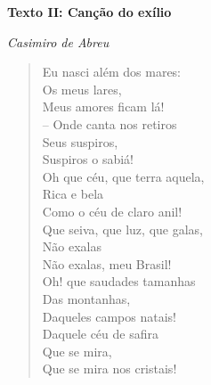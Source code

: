 \begin{myquote}
\pagebreak 

\textbf{Texto II: Canção do exílio}

\emph{Casimiro de Abreu}


\begin{verse}

\begin{minipage}{0.5\textwidth}
Eu nasci além dos mares: \\
\qquad Os meus lares, \\
Meus amores ficam lá! \\
– Onde canta nos retiros \\
\qquad Seus suspiros, \\
Suspiros o sabiá! \\

Oh que céu, que terra aquela, \\
\qquad Rica e bela \\
Como o céu de claro anil! \\
Que seiva, que luz, que galas, \\
\qquad Não exalas \\
Não exalas, meu Brasil! \\

Oh! que saudades tamanhas \\
\qquad Das montanhas, \\
Daqueles campos natais! \\
Daquele céu de safira \\
\qquad Que se mira, \\
Que se mira nos cristais! \\


\end{minipage}
\end{verse}
\end{myquote}
